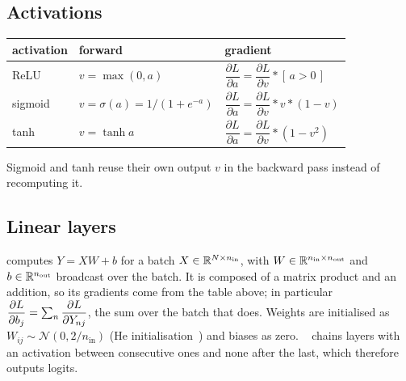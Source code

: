 \subsection{Activations}
\begin{center}
\renewcommand{\arraystretch}{2.4}\renewcommand{\dL}[1]{\dfrac{\partial L}{\partial #1}}  %
\begin{tabular}{@{}lll@{}}
\toprule
activation & forward & gradient \\
\midrule
ReLU    & $v = \max(0, a)$                 & $\dL{a} = \dL{v} \ast [\,a > 0\,]$ \\
sigmoid & $v = \sigma(a) = 1/(1 + e^{-a})$ & $\dL{a} = \dL{v} \ast v \ast (1 - v)$ \\
tanh    & $v = \tanh a$                    & $\dL{a} = \dL{v} \ast (1 - v^2)$ \\
\bottomrule
\end{tabular}
\end{center}
Sigmoid and tanh reuse their own output $v$ in the backward pass instead of recomputing it.

\subsection{Linear layers}
 computes $Y = XW + b$ for a batch $X \in \mathbb{R}^{N\times n_\text{in}}$,
with $W \in \mathbb{R}^{n_\text{in}\times n_\text{out}}$ and $b \in \mathbb{R}^{n_\text{out}}$ broadcast over the
batch. It is composed of a matrix product and an addition, so its gradients come from the table
above; in particular $\dL{b_j} = \sum_{n} \dL{Y_{nj}}$, the sum over the batch that  does. Weights are
initialised as $W_{ij} \sim \mathcal{N}(0, 2/n_\text{in})$ (He initialisation~\cite{he2015}) and
biases as zero. ~\cite{upc-aa1} chains  layers with an activation between consecutive ones
and none after the last, which therefore outputs logits.

